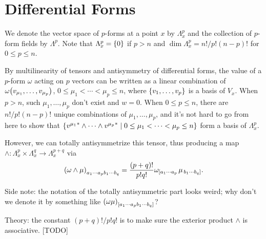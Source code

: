 \documentclass{note}
\numberwithin{equation}{chapter}
\begin{document}
\section{Differential Forms}


\begin{quotebar}
    We denote the vector space of $p$-forms at a point $x$ by $\Lambda_x^p$ and the
    collection of $p$-form fields by $\Lambda^p$. Note that $\Lambda_x^p = \set{0}$
    if $p > n$ and $\dim \Lambda_x^p = n!/p!(n-p)!$ for $0 \leq p \leq n$.
\end{quotebar}

By multilinearity of tensors and antisymmetry of differential forms, the value
of a $p$-form $\omega$ acting on $p$ vectors can be written as a linear
combination of $\omega\prn{v_{\mu_1},\dots,v_{\mu_p}}$, $0 \leq \mu_1 < \cdots
    < \mu_p \leq n$, where $\set{v_1,\dots,v_p}$ is a basis of $V_x$. When $p > n$,
such $\mu_1, \dots, \mu_p$ don't exist and $w = 0$. When $0 \leq p \leq n$,
there are $n!/p!(n-p)!$ unique combinations of $\mu_1, \dots, \mu_p$, and it's
not hard to go from here to show that $\setbuilder{{v^{\mu_1}}^* \wedge \cdots
        \wedge {v^{\mu_p}}^*}{0 \leq \mu_1 < \cdots < \mu_p \leq n}$ form a basis of
$\Lambda_x^p$.

\begin{quotebar}
    However, we can totally antisymmetrize this tensor, thus producing a map
    $\wedge\colon \Lambda_x^p\times\Lambda_x^q \to \Lambda_x^{p+q}$ via
    \begin{equation*}
        \prn{\omega\wedge\mu}_{a_1\cdots a_pb_1\cdots b_q} = \frac{(p+q)!}{p!q!}
        \omega_{\left[a_1\cdots a_p\right.}\mu_{\left.b_1\cdots b_q\right]}.
    \end{equation*}
\end{quotebar}

Side note: the notation of the totally antisymmetric part looks weird; why
don't we denote it by something like $\prn{\omega\mu}_{\left[a_1\cdots a_p
        b_1\cdots b_q\right]}$?

Theory: the constant $(p+q)!/p!q!$ is to make sure the exterior product
$\wedge$ is associative. [TODO]
\end{document}
